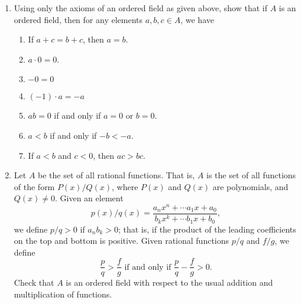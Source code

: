 \documentclass[letterpaper,12pt]{article}
\begin{document}
\begin{enumerate}
 \item Using only the axioms of an ordered field as given above, show that if $A$ is an ordered field, then for any elements $a,b,c\in A$, we have
\begin{enumerate}
 \item If $a+c=b+c$, then $a=b$.
 \item $a\cdot 0 = 0$.
 \item $-0 = 0$
 \item $(-1)\cdot a = -a$
 \item $ab = 0$ if and only if $a=0$ or $b=0$.
 \item $a<b$ if and only if $-b<-a$.
 \item If $a<b$ and $c<0$, then $ac>bc$.
\end{enumerate}
 \item Let $A$ be the set of all rational functions. That is, $A$ is the set of all functions of the form $P(x)/Q(x)$, where $P(x)$ and $Q(x)$ are polynomials, and $Q(x)\neq 0$. Given an element
\[
 p(x)/q(x) = \frac{a_nx^n+\cdots a_1x+a_0}{b_kx^k+\cdots b_1x+b_0},
\]
we define $p/q>0$ if $a_nb_k >0$; that is, if the product of the leading coefficients on the top and bottom is positive. Given rational functions $p/q$ and $f/g$, we define 
\[
 \frac{p}{q}>\frac{f}{g} \text{ if and only if } \frac{p}{q}-\frac{f}{g}>0.
\]
Check that $A$ is an ordered field with respect to the usual addition and multiplication of functions.
\end{enumerate}
\end{document}

